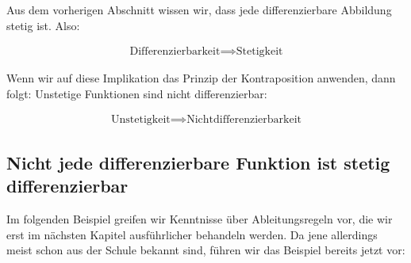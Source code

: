 \documentclass[fontsize=9pt,
               parskip=half-,
               DIV=14,
               listof=chapterentry,
               tocflat]{scrbook}
\begin{document}
Aus dem vorherigen Abschnitt wissen wir, dass jede differenzierbare Abbildung stetig ist. Also:

\begin{align*}
{\text{Differenzierbarkeit}}\implies {\text{Stetigkeit}}
\end{align*}

Wenn wir auf diese Implikation das Prinzip der Kontraposition anwenden, dann folgt: Unstetige Funktionen sind nicht differenzierbar:

\begin{align*}
{\text{Unstetigkeit}}\implies {\text{Nichtdifferenzierbarkeit}}
\end{align*}

\subsection{Nicht jede differenzierbare Funktion ist stetig differenzierbar}

Im folgenden Beispiel greifen wir Kenntnisse über Ableitungsregeln vor, die wir erst im nächsten Kapitel ausführlicher behandeln werden. Da jene allerdings meist schon aus der Schule bekannt sind, führen wir das Beispiel bereits jetzt vor:
\end{document}
